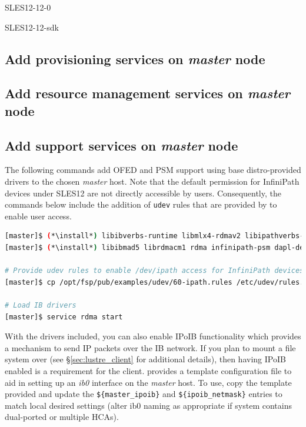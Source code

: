 \documentclass[letterpaper]{article}
\newcommand{\baseOS}{SLES12}
\newcommand{\install}{zypper -n install}
\begin{document}
\begin{itemize*}
\item SLES12-12-0
\item SLES12-12-sdk
\end{itemize*}

\subsection{Add provisioning services on {\em master} node} \label{sec:add_provisioning}


\subsection{Add resource management services on {\em master} node} \label{sec:add_rm}


\subsection{Add \InfiniBand{} support services on {\em master} node} \label{sec:add_ofed}

The following commands add OFED and PSM support using base distro-provided drivers to the
chosen {\em master} host. Note that the default permission for InfiniPath
devices under \baseOS{} are not directly accessible by users. Consequently, the commands
below include the addition of \texttt{udev} rules that are provided by \FSP{}
to enable user access.

\begin{lstlisting}[language=bash,keywords={}]
[master]$ (*\install*) libibverbs-runtime libmlx4-rdmav2 libipathverbs-rdmav2
[master]$ (*\install*) libibmad5 librdmacm1 rdma infinipath-psm dapl-devel dapl-utils 

# Provide udev rules to enable /dev/ipath access for InfiniPath devices
[master]$ cp /opt/fsp/pub/examples/udev/60-ipath.rules /etc/udev/rules.d/

# Load IB drivers
[master]$ service rdma start
\end{lstlisting}

With the \InfiniBand{} drivers included, you can also enable IPoIB functionality
which provides a mechanism to send IP packets over the IB network. If you plan
to mount a \Lustre{} file system over \InfiniBand{} (see \S\ref{sec:lustre_client}
for additional details), then having IPoIB enabled is a requirement for the
\Lustre{} client. \FSP{} provides a template configuration file to aid in setting up
an {\em ib0} interface on the {\em master} host. To use, copy the template
provided and update the \texttt{\$\{master\_ipoib\}} and
\texttt{\$\{ipoib\_netmask\}} entries to match local desired settings (alter ib0
naming as appropriate if system contains dual-ported or multiple HCAs). 
\end{document}

